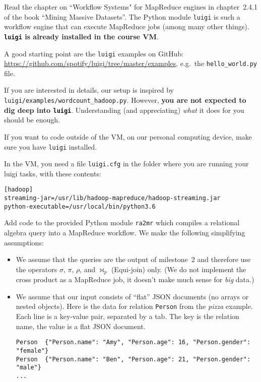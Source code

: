 \documentclass[12pt]{exam}
\begin{document}
\begin{questions}

\question
Read the chapter on ``Workflow Systems" for MapReduce engines in chapter~2.4.1
of the book ``Mining Massive Datasets''. The Python module \verb!luigi! is such a workflow engine that can execute MapReduce jobs (among many other things). {\bf \verb!luigi! is already installed in the course VM}.

A good starting point are the \verb!luigi! examples on GitHub: \url{https://github.com/spotify/luigi/tree/master/examples}, e.g.\ the \verb!hello_world.py! file.

If you are interested in details, our setup is inspired by \verb!luigi/examples/wordcount_hadoop.py!. However, {\bf you are not expected to dig deep into \verb!luigi!}. Understanding (and appreciating) {\em what}\/ it does for you should be enough.

If you want to code outside of the VM, on our personal computing device, make sure you have \verb!luigi! installed. 


\question 
In the VM, you need a file \verb!luigi.cfg! in the folder where you are running your luigi tasks, with these contents:  
\begin{Verbatim}[frame=single,fontsize=\small]
[hadoop]
streaming-jar=/usr/lib/hadoop-mapreduce/hadoop-streaming.jar
python-executable=/usr/local/bin/python3.6
\end{Verbatim}


\question Add code to the provided Python module \verb!ra2mr! which compiles a relational algebra query into a MapReduce workflow. We make the following simplifying assumptions:

\begin{itemize}
    \item 

We assume that the queries are the output of milestone~2 and therefore use the operators $\sigma$, $\pi$, $\rho$, and $\bowtie_p$ (Equi-join) only. (We do not implement the cross product as a MapReduce job, it doesn't make much sense for {\em big}\/ data.)

\item
We assume that our input consists of ``flat'' JSON documents (no arrays or  nested objects). Here is the data for  relation \verb!Person! from the {\em pizza}\/ example. Each line is a key-value pair, separated by a tab. The key is the relation name, the value is a flat JSON document.

\begin{Verbatim}[frame=single,fontsize=\scriptsize]
Person	{"Person.name": "Amy", "Person.age": 16, "Person.gender": "female"}
Person	{"Person.name": "Ben", "Person.age": 21, "Person.gender": "male"}
...
\end{Verbatim}



\end{itemize}
\end{questions}
\end{document}
